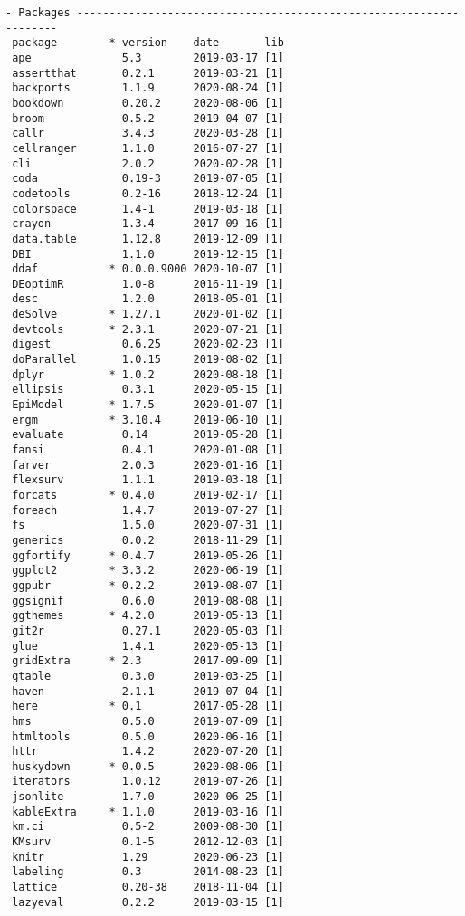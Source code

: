 \documentclass [11pt, proquest] {uwthesis}[2015/03/03]
\begin{document}
\begin{verbatim}
- Packages -------------------------------------------------------------------
 package        * version    date       lib
 ape              5.3        2019-03-17 [1]
 assertthat       0.2.1      2019-03-21 [1]
 backports        1.1.9      2020-08-24 [1]
 bookdown         0.20.2     2020-08-06 [1]
 broom            0.5.2      2019-04-07 [1]
 callr            3.4.3      2020-03-28 [1]
 cellranger       1.1.0      2016-07-27 [1]
 cli              2.0.2      2020-02-28 [1]
 coda             0.19-3     2019-07-05 [1]
 codetools        0.2-16     2018-12-24 [1]
 colorspace       1.4-1      2019-03-18 [1]
 crayon           1.3.4      2017-09-16 [1]
 data.table       1.12.8     2019-12-09 [1]
 DBI              1.1.0      2019-12-15 [1]
 ddaf           * 0.0.0.9000 2020-10-07 [1]
 DEoptimR         1.0-8      2016-11-19 [1]
 desc             1.2.0      2018-05-01 [1]
 deSolve        * 1.27.1     2020-01-02 [1]
 devtools       * 2.3.1      2020-07-21 [1]
 digest           0.6.25     2020-02-23 [1]
 doParallel       1.0.15     2019-08-02 [1]
 dplyr          * 1.0.2      2020-08-18 [1]
 ellipsis         0.3.1      2020-05-15 [1]
 EpiModel       * 1.7.5      2020-01-07 [1]
 ergm           * 3.10.4     2019-06-10 [1]
 evaluate         0.14       2019-05-28 [1]
 fansi            0.4.1      2020-01-08 [1]
 farver           2.0.3      2020-01-16 [1]
 flexsurv         1.1.1      2019-03-18 [1]
 forcats        * 0.4.0      2019-02-17 [1]
 foreach          1.4.7      2019-07-27 [1]
 fs               1.5.0      2020-07-31 [1]
 generics         0.0.2      2018-11-29 [1]
 ggfortify      * 0.4.7      2019-05-26 [1]
 ggplot2        * 3.3.2      2020-06-19 [1]
 ggpubr         * 0.2.2      2019-08-07 [1]
 ggsignif         0.6.0      2019-08-08 [1]
 ggthemes       * 4.2.0      2019-05-13 [1]
 git2r            0.27.1     2020-05-03 [1]
 glue             1.4.1      2020-05-13 [1]
 gridExtra      * 2.3        2017-09-09 [1]
 gtable           0.3.0      2019-03-25 [1]
 haven            2.1.1      2019-07-04 [1]
 here           * 0.1        2017-05-28 [1]
 hms              0.5.0      2019-07-09 [1]
 htmltools        0.5.0      2020-06-16 [1]
 httr             1.4.2      2020-07-20 [1]
 huskydown      * 0.0.5      2020-08-06 [1]
 iterators        1.0.12     2019-07-26 [1]
 jsonlite         1.7.0      2020-06-25 [1]
 kableExtra     * 1.1.0      2019-03-16 [1]
 km.ci            0.5-2      2009-08-30 [1]
 KMsurv           0.1-5      2012-12-03 [1]
 knitr            1.29       2020-06-23 [1]
 labeling         0.3        2014-08-23 [1]
 lattice          0.20-38    2018-11-04 [1]
 lazyeval         0.2.2      2019-03-15 [1]

\end{verbatim}
\end{document}

